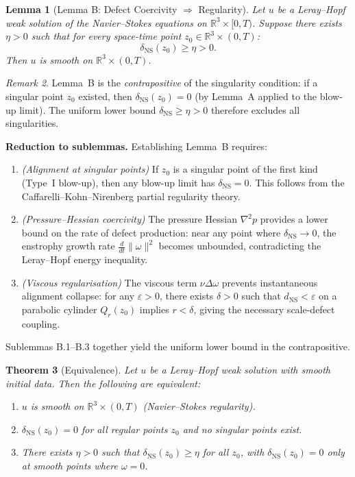 \documentclass[11pt]{article}
\newtheorem{theorem}{Theorem}[section]
\newtheorem{lemma}[theorem]{Lemma}
\theoremstyle{definition}
\theoremstyle{remark}
\newtheorem{remark}[theorem]{Remark}
\begin{document}
\begin{lemma}[Lemma B: Defect Coercivity $\Rightarrow$ Regularity]
\label{lem:ns-B}
Let $u$ be a Leray--Hopf weak solution of the Navier--Stokes equations on
$\mathbb{R}^3 \times [0,T)$.  Suppose there exists $\eta > 0$ such that for
every space-time point $z_0 \in \mathbb{R}^3 \times (0,T)$:
\[
  \delta_{\mathrm{NS}}(z_0) \geq \eta > 0.
\]
Then $u$ is smooth on $\mathbb{R}^3 \times (0,T)$.
\end{lemma}

\begin{remark}
Lemma~B is the \emph{contrapositive} of the singularity condition: if a
singular point $z_0$ existed, then $\delta_{\mathrm{NS}}(z_0) = 0$ (by
Lemma~A applied to the blow-up limit).  The uniform lower bound
$\delta_{\mathrm{NS}} \geq \eta > 0$ therefore excludes all singularities.

\medskip
\noindent\textbf{Reduction to sublemmas.}  Establishing Lemma~B requires:
\begin{enumerate}
  \item[\textbf{B.1}] \emph{(Alignment at singular points)} If $z_0$ is a
    singular point of the first kind (Type~I blow-up), then any blow-up limit
    has $\delta_{\mathrm{NS}} = 0$.  This follows from the
    Caffarelli--Kohn--Nirenberg partial regularity theory.
  \item[\textbf{B.2}] \emph{(Pressure--Hessian coercivity)} The pressure
    Hessian $\nabla^2 p$ provides a lower bound on the rate of defect
    production: near any point where $\delta_{\mathrm{NS}} \to 0$, the
    enstrophy growth rate $\frac{d}{dt}\|\omega\|^2$ becomes unbounded,
    contradicting the Leray--Hopf energy inequality.
  \item[\textbf{B.3}] \emph{(Viscous regularisation)} The viscous term
    $\nu \Delta \omega$ prevents instantaneous alignment collapse: for any
    $\varepsilon > 0$, there exists $\delta > 0$ such that
    $d_{\mathrm{NS}} < \varepsilon$ on a parabolic cylinder $Q_r(z_0)$
    implies $r < \delta$, giving the necessary scale-defect coupling.
\end{enumerate}
Sublemmas B.1--B.3 together yield the uniform lower bound in the
contrapositive.
\end{remark}

\begin{theorem}[Equivalence]
\label{thm:ns-equiv}
Let $u$ be a Leray--Hopf weak solution with smooth initial data.  Then the
following are equivalent:
\begin{enumerate}
  \item[(i)] $u$ is smooth on $\mathbb{R}^3 \times (0,T)$ (Navier--Stokes regularity).
  \item[(ii)] $\delta_{\mathrm{NS}}(z_0) = 0$ for all regular points $z_0$
    and no singular points exist.
  \item[(iii)] There exists $\eta > 0$ such that
    $\delta_{\mathrm{NS}}(z_0) \geq \eta$ for all $z_0$, with
    $\delta_{\mathrm{NS}}(z_0) = 0$ only at smooth points where $\omega = 0$.
\end{enumerate}
\end{theorem}
\end{document}
